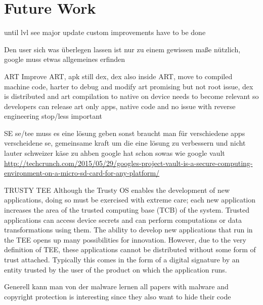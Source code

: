 \section{Future Work}\label{section:conclusion-future}
until lvl see major update custom improvements have to be done

Den user sich was überlegen lassen ist nur zu einem gewissen maße nützlich, google muss etwas allgemeines erfinden

ART
Improve ART, \gls{apk} still dex, dex also inside ART, move to compiled machine code, harter to debug and modify
art promising but not root issue, dex is distributed and art compilation to native on device
needs to become relevant so developers can release art only apps, native code and no issue with reverse engineering stop/less important
\cite{andevconDalvikART}

SE
se/tee muss es eine lösung geben sonst braucht man für verschiedene apps verscheidene se, gemeinsame kraft um die eine lösung zu verbessern und nicht lauter schweizer käse zu ahben
google hat schon sowas wie google vault
\url{http://techcrunch.com/2015/05/29/googles-project-vault-is-a-secure-computing-environment-on-a-micro-sd-card-for-any-platform/}

TRUSTY TEE
Although the Trusty OS enables the development of new applications, doing so must be exercised with extreme care; each new application increases the area of the trusted computing base (TCB) of the system. Trusted applications can access device secrets and can perform computations or data transformations using them.\cite{trusty} \cite{teeGlobal}
The ability to develop new applications that run in the TEE opens up many possibilities for innovation. However, due to the very definition of TEE, these applications cannot be distributed without some form of trust attached. Typically this comes in the form of a digital signature by an entity trusted by the user of the product on which the application runs.



Generell kann man von der malware lernen
all papers with malware and copyright protection is interesting since they also want to hide their code
